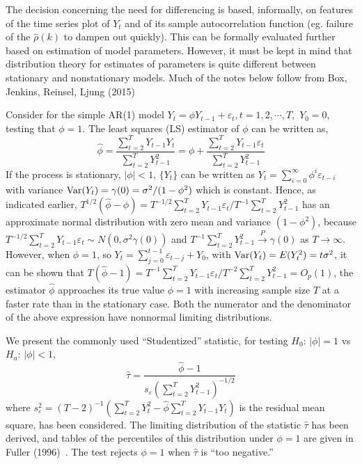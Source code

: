 The decision concerning the need for differencing is based, informally, on features of the time series plot of $Y_t$ and of its sample autocorrelation function (eg. failure of the $\hat{\rho}(k)$ to dampen out quickly). This can be formally evaluated further based on estimation of model parameters. However, it must be kept in mind that distribution theory for estimates of parameters is quite different between stationary and nonstationary models. Much of the notes below follow from Box, Jenkins, Reinsel, Ljung (2015)~\cite{ljung15}


Consider for the simple AR(1) model $Y_t = \phi Y_{t-1} + \varepsilon_t, t = 1,2,\cdots,T,$ $Y_0 = 0$, testing that $\phi = 1$. The least squares (LS) estimator of $\phi$ can be written as,
	\begin{equation}\label{eqn:futurereffirst}
	\hat{\phi} = \dfrac{\sum_{t=2}^T Y_{t-1}Y_t}{\sum_{t=2}^T Y_{t-1}^2} = \phi + \dfrac{\sum_{t=2}^T Y_{t-1}\varepsilon_t}{\sum_{t=2}^T Y_{t-1}^2}
	\end{equation}
If the process is stationary, $|\phi| < 1$, $\{Y_t\}$ can be written as $Y_t = \sum_{i=0}^\infty\phi^i\varepsilon_{t-i}$ with variance $\operatorname{Var}(Y_t) = \gamma(0) = \sigma^2/(1-\phi^2)$ which is constant. Hence, as indicated earlier, $T^{1/2}(\hat{\phi} - \phi) = T^{-1/2}\sum_{t=2}^T Y_{t-1}\varepsilon_t/T^{-1}\sum_{t=2}^TY_{t-1}^2$ has an approximate normal distribution with zero mean and variance $(1 - \phi^2)$, because $T^{-1/2}\sum_{t=2}^T Y_{t-1}\varepsilon_t \sim N(0,\sigma^2\gamma(0))$ and $T^{-1}\sum_{t=2}^TY_{t-1}^2 \xrightarrow{P} \gamma(0)$ as $T \to \infty$. However, when $\phi = 1$, so $Y_t = \sum_{j=0}^{t-1}\varepsilon_{t-j} + Y_0$, with $\operatorname{Var}(Y_t) = E(Y_t^2) = t\sigma^2$, it can be shown that $T(\hat{\phi} - 1) = T^{-1}\sum_{t=2}^T Y_{t-1}\varepsilon_t/T^{-2}\sum_{t=2}^T Y_{t-1}^2 = O_p(1)$, the estimator $\hat{\phi}$ approaches its true value $\phi = 1$ with increasing sample size $T$ at a faster rate than in the stationary case. Both the numerator and the denominator of the above expression have nonnormal limiting distributions. 


We present the commonly used ``Studentized'' statistic, for testing $H_0: \, |\phi|=1$ vs $H_a: \, |\phi|<1$,
	\begin{equation}\label{eqn:hattaunew}
	\hat{\tau} = \dfrac{\hat{\phi} - 1}{s_{\varepsilon}\left(\sum_{t=2}^T Y_{t-1}^2\right)^{-1/2}}
	\end{equation}
where $s_\varepsilon^2 = (T - 2)^{-1}(\sum_{t=2}^T Y_t^2 - \hat{\phi}\sum_{t=2}^T Y_{t-1}Y_t)$ is the residual mean square, has been considered. The limiting distribution of the statistic $\hat{\tau}$ has been derived, and tables of the percentiles of this distribution under $\phi = 1$ are given in Fuller (1996)~\cite{fuller1996}. The test rejects $\phi = 1$ when $\hat{\tau}$ is ``too negative.''


